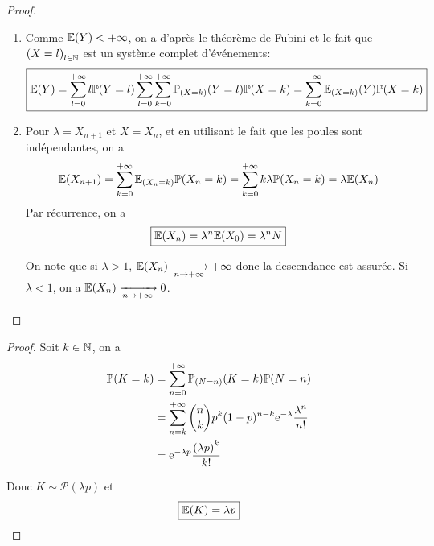 \begin{proof}
    \phantom{}
    \begin{enumerate}
        \item Comme $\mathbb{E}(Y)<+\infty$, on a d'après le théorème de Fubini et le fait que $\left(X=l\right)_{l\in\mathbb{N}}$ est un système complet d'événements:
        \begin{equation}
            \boxed{\mathbb{E}(Y)=\sum_{l=0}^{+\infty}l\mathbb{P}(Y=l)\sum_{l=0}^{+\infty}\sum_{k=0}^{+\infty}\mathbb{P}_{(X=k)}(Y=l)\mathbb{P}(X=k)=\sum_{k=0}^{+\infty}\mathbb{E}_{(X=k)}(Y)\mathbb{P}(X=k)}
        \end{equation}

        \item Pour $\lambda=X_{n+1}$ et $X=X_{n}$, et en utilisant le fait que les poules sont indépendantes, on a 
        \begin{equation}
            \mathbb{E}(X_{n+1})=\sum_{k=0}^{+\infty}\mathbb{E}_{(X_{n}=k)}\mathbb{P}(X_{n}=k)=\sum_{k=0}^{+\infty}k\lambda\mathbb{P}(X_{n}=k)=\lambda\mathbb{E}(X_{n})
        \end{equation}
        Par récurrence, on a 
        \begin{equation}
            \boxed{\mathbb{E}(X_{n})=\lambda^{n}\mathbb{E}(X_{0})=\lambda^{n}N}
        \end{equation}

        On note que si $\lambda>1$, $\mathbb{E}(X_{n})\xrightarrow[n\to+\infty]{}+\infty$ donc la descendance est assurée. Si $\lambda<1$, on a $\mathbb{E}(X_{n})\xrightarrow[n\to+\infty]{}0$.
    \end{enumerate}
\end{proof}

\begin{proof}
    Soit $k\in\mathbb{N}$, on a 
    \begin{align}
        \mathbb{P}(K=k)
        &=\sum_{n=0}^{+\infty}\mathbb{P}_{(N=n)}(K=k)\mathbb{P}(N=n)\\
        &=\sum_{n=k}^{+\infty}\binom{n}{k}p^{k}(1-p)^{n-k}\mathrm{e}^{-\lambda}\frac{\lambda^{n}}{n!}\\
        &=\mathrm{e}^{-\lambda p}\frac{\left(\lambda p\right)^{k}}{k!}
    \end{align}

    Donc $K\sim\mathcal{P}(\lambda p)$ et 
    \begin{equation}
        \boxed{\mathbb{E}(K)=\lambda p}
    \end{equation}
\end{proof}

